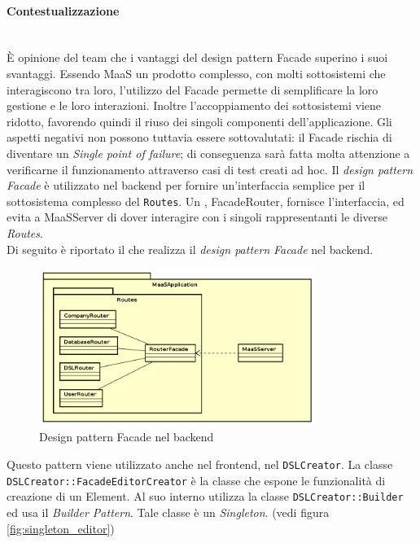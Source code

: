 \paragraph{Contestualizzazione}\mbox{} \\
È opinione del team che i vantaggi del design pattern Facade superino i suoi svantaggi. Essendo MaaS un prodotto complesso, con molti sottosistemi che interagiscono tra loro, l'utilizzo del Facade permette di semplificare la loro gestione e le loro interazioni. Inoltre l'accoppiamento dei sottosistemi viene ridotto, favorendo quindi il riuso dei singoli componenti dell'applicazione. Gli aspetti negativi non possono tuttavia essere sottovalutati: il Facade rischia di diventare un \textit{Single point of failure}; di conseguenza sarà fatta molta attenzione a verificarne il funzionamento attraverso casi di test creati ad hoc.
Il \textit{design pattern} \textit{Facade} è utilizzato nel backend per fornire un'interfaccia semplice per il sottosistema complesso del  \texttt{Routes}. Un , FacadeRouter, fornisce l'interfaccia, ed evita a MaaSServer di dover interagire con i singoli  rappresentanti le diverse \textit{Routes}. \\
Di seguito è riportato il  che realizza il \textit{design pattern} \textit{Facade} nel backend.
\begin{figure}[H]
\centering
\includegraphics[width=0.8\textwidth]{res/sections/backend/facadeRoutes.png}
\caption{Design pattern Facade nel backend}
\end{figure}
Questo pattern viene utilizzato anche nel frontend, nel  \texttt{DSLCreator}. La classe \texttt{DSLCreator::FacadeEditorCreator} è la classe che espone le funzionalità di creazione di un  Element. Al suo interno utilizza la classe \texttt{DSLCreator::Builder} ed usa il \textit{Builder Pattern}. Tale classe è un \textit{Singleton}. (vedi figura \ref{fig:singleton_editor})
